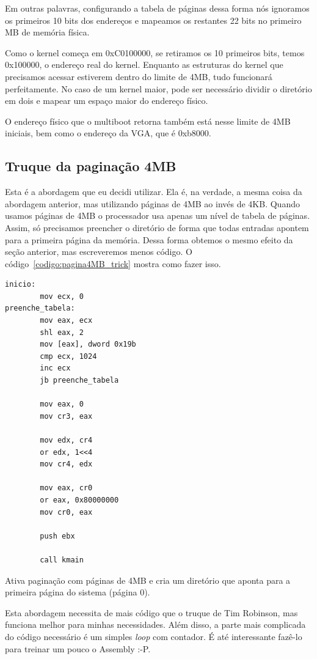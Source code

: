 \documentclass{article}
\begin{document}
Em outras palavras, configurando a tabela de páginas dessa forma nós ignoramos
os primeiros 10 bits dos endereços e mapeamos os restantes 22 bits no primeiro
MB de memória física.

Como o kernel começa em 0xC0100000, se retiramos os 10 primeiros bits, temos
0x100000, o endereço real do kernel. Enquanto as estruturas do kernel que
precisamos acessar estiverem dentro do limite de 4MB, tudo funcionará
perfeitamente. No caso de um kernel maior, pode ser necessário dividir o
diretório em dois e mapear um espaço maior do endereço físico.

O endereço físico que o multiboot retorna também está nesse limite de 4MB
iniciais, bem como o endereço da VGA, que é 0xb8000.

\subsection{Truque da paginação 4MB}
\label{subsec:paginacao_4MB}
Esta é a abordagem que eu decidi utilizar. Ela é, na verdade, a mesma coisa da
abordagem anterior, mas utilizando páginas de 4MB ao invés de 4KB. Quando usamos
páginas de 4MB o processador usa apenas um nível de tabela de páginas. Assim, só
precisamos preencher o diretório de forma que todas entradas apontem para a
primeira página da memória. Dessa forma obtemos o mesmo efeito da seção
anterior, mas escreveremos menos código. O código~\ref{codigo:pagina4MB_trick}
mostra como fazer isso.

\begin{codigo}
\begin{verbatim}
inicio:
        mov ecx, 0
preenche_tabela:
        mov eax, ecx
        shl eax, 2
        mov [eax], dword 0x19b
        cmp ecx, 1024
        inc ecx
        jb preenche_tabela

        mov eax, 0
        mov cr3, eax

        mov edx, cr4
        or edx, 1<<4
        mov cr4, edx

        mov eax, cr0
        or eax, 0x80000000
        mov cr0, eax

        push ebx 

        call kmain
\end{verbatim}
\caption{Ativa paginação com páginas de 4MB e cria um diretório que aponta para
a primeira página do sistema (página 0).}
\label{codigo:pagina4MB_trick}
\end{codigo}

Esta abordagem necessita de mais código que o truque de Tim Robinson, mas
funciona melhor para minhas necessidades. Além disso, a parte mais complicada do
código necessário é um simples \emph{loop} com contador. É até interessante
fazê-lo para treinar um pouco o Assembly :-P.
\end{document}
